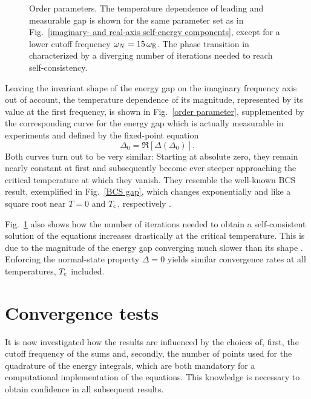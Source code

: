 \begin{figure}
    \small
    \centering
    
    \caption[ gap]{
        Order parameters. The temperature dependence of leading 
        and measurable gap is shown for the same parameter set as in
        Fig.~\ref{imaginary- and real-axis self-energy components}, except for a
        lower cutoff frequency $\omega_N = 15 \, \omega \sb{\text{E}}$. The phase
        transition in characterized by a diverging number of iterations needed
        to reach self-consistency.}
    \label{order parameter}
\end{figure}
%
Leaving the invariant shape of the energy gap on the imaginary frequency axis
out of account, the temperature dependence of its magnitude, represented by its
value at the first  frequency, is shown in Fig.~\ref{order
parameter}, supplemented by the corresponding curve for the energy gap which is
actually measurable in experiments and defined by the fixed-point equation
\cite[Eq.~3a]{VidbergSerene77}
%
\begin{equation} \label{measurable gap}
    \Delta_0 = \Re[\Delta(\Delta_0)].
\end{equation}
%
Both curves turn out to be very similar: Starting at absolute zero, they remain
nearly constant at first and subsequently become ever steeper approaching the
critical temperature at which they vanish. They resemble the well-known BCS
result, exemplified in Fig.~\ref{BCS gap}, which changes exponentially and like
a square root near $T = 0$ and $T \sb{\text{c}}$, respectively
\cite[Eq.~11.60]{Czycholl08}.

Fig.~\ref{order parameter} also shows how the number of iterations needed to
obtain a self-consistent solution of the  equations increases
drastically at the critical temperature. This is due to the magnitude of the
energy gap converging much slower than its shape \cite[185]{VidbergSerene77}.
Enforcing the normal-state property $\Delta = 0$ yields similar convergence
rates at all temperatures, $T \sb{\text{c}}$ included.

\section{Convergence tests}

It is now investigated how the results are influenced by the choices of, first,
the cutoff frequency of the  sums and, secondly, the number of
points used for the quadrature of the energy integrals, which are both mandatory
for a computational implementation of the  equations. This
knowledge is necessary to obtain confidence in all subsequent results.

